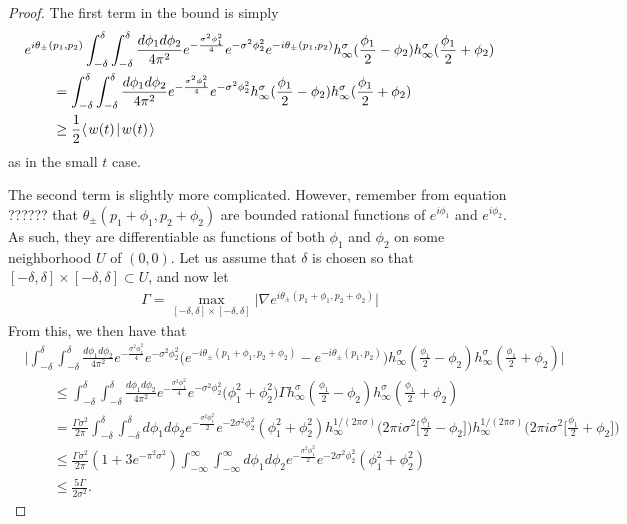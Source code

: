 \documentclass[../thesis-main/thesis-main]{subfiles}
\begin{document}
\begin{proof}
The first term in the bound is simply
\begin{align}
  &e^{i\theta_\pm(p_1,p_2)} \int_{-\delta}^\delta \int_{-\delta}^\delta \frac{d\phi_1 d\phi_2}{4\pi^2} e^{- \frac{\sigma^2 \phi_1^2}{4}}e^{-\sigma^2 \phi_2^2} e^{-i \theta_{\pm}(p_1,p_2) }h_\infty^\sigma(\frac{\phi_1}{2} - \phi_{2} ) h_{\infty}^\sigma ( \frac{\phi_1}{2} + \phi_2) \\
  &  \qquad = \int_{-\delta}^\delta \int_{-\delta}^\delta \frac{d\phi_1 d\phi_2}{4\pi^2} e^{- \frac{\sigma^2 \phi_1^2}{4}}e^{-\sigma^2 \phi_2^2}h_\infty^\sigma(\frac{\phi_1}{2} - \phi_{2} ) h_{\infty}^\sigma ( \frac{\phi_1}{2} + \phi_2) \\
  & \qquad \geq \frac{1}{2} \langle\mspace{2mu} w(t) \mspace{2mu} | \mspace{2mu} w(t)\mspace{2mu} \rangle
\end{align}
as in the small $t$ case.

The second term is slightly more complicated.  However, remember from equation ??????  that $\theta_\pm(p_1+\phi_1,p_2+\phi_2)$ are bounded rational functions of $e^{i\phi_1}$ and $e^{i\phi_2}$.  As such, they are differentiable as functions of both $\phi_1$ and $\phi_2$ on some neighborhood $U$ of $(0,0)$.  Let us assume that $\delta$ is chosen so that $[-\delta,\delta]\times [-\delta,\delta] \subset U$, and now let
\begin{align}
  \Gamma = \max_{[-\delta,\delta]\times [-\delta,\delta]} \big|\nabla e^{i \theta_{\pm}(p_1 +\phi_1, p_2 +\phi_2)}\big|
\end{align}
From this, we then have that
\begin{align}
  &\Bigg|\int_{-\delta}^\delta \int_{-\delta}^\delta \frac{d\phi_1 d\phi_2}{4\pi^2} e^{- \frac{\sigma^2 \phi_1^2}{4}}e^{-\sigma^2 \phi_2^2}  \big(e^{- i\theta_{\pm}(p_1 + \phi_1, p_2 + \phi_2)} - e^{- i \theta_{\pm}(p_1, p_2)}  \big) h_\infty^\sigma(\frac{\phi_1}{2} - \phi_{2} ) h_{\infty}^\sigma ( \frac{\phi_1}{2} + \phi_2)\Bigg|\nonumber\\
  & \qquad \leq \int_{-\delta}^\delta \int_{-\delta}^\delta \frac{d\phi_1 d\phi_2}{4\pi^2} e^{- \frac{\sigma^2 \phi_1^2}{4}}e^{-\sigma^2 \phi_2^2}  \big(\phi_1^2 + \phi_2^2 \big) \Gamma h_\infty^\sigma(\frac{\phi_1}{2} - \phi_{2} ) h_{\infty}^\sigma ( \frac{\phi_1}{2} + \phi_2)\\
  & \qquad = \frac{\Gamma\sigma^2}{2\pi} \int_{-\delta}^\delta \int_{-\delta}^\delta {d\phi_1 d\phi_2} e^{- \frac{\sigma^2 \phi_1^2}{2}}e^{-2\sigma^2 \phi_2^2}( \phi_1^2 + \phi_2^2) h_\infty^{1/(2\pi \sigma)} \Big(2 \pi i \sigma^2 \Big[\frac{\phi_1}{2} - \phi_2 \Big]\Big) h_\infty^{1/(2\pi \sigma)}  \Big(2 \pi i \sigma^2 \Big[\frac{\phi_1}{2} + \phi_2 \Big]\Big) \\
  & \qquad \leq \frac{\Gamma\sigma^2}{2\pi} (1 + 3 e^{- \pi^2 \sigma^2}) \int_{-\infty}^\infty \int_{-\infty}^\infty {d\phi_1 d\phi_2} e^{- \frac{\sigma^2 \phi_1^2}{2}}e^{-2\sigma^2 \phi_2^2}( \phi_1^2 + \phi_2^2)\\
  & \qquad \leq \frac{5\Gamma }{2\sigma^2}.
\end{align}


\end{proof}
\end{document}

